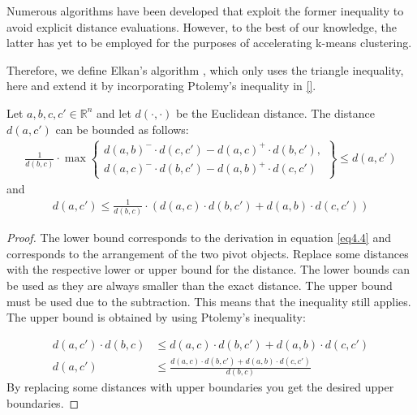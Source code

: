 Numerous algorithms have been developed that exploit the former inequality to avoid explicit distance evaluations. However, to the best of our knowledge, the latter has yet to be employed for the purposes of accelerating k-means clustering.

Therefore, we define Elkan's algorithm \cite{}, which only uses the triangle inequality, here and extend it by incorporating Ptolemy's inequality in \ref{}.



\begin{theorem}
	\label{thm4.2}
	Let \(a, b, c, c' \in \mathbb{R}^n\) and let \(d(\cdot, \cdot)\) be the Euclidean distance. The distance \(d(a, c')\) can be bounded as follows:
	\begin{gather}
		\frac{1}{d(b, c)} \cdot \max \left\{
		\begin{array}{l}
			d(a, b)^- \cdot d(c, c') - d(a, c)^+ \cdot d(b, c'), \\
			d(a, c)^- \cdot d(b, c') - d(a, b)^+ \cdot d(c, c')
		\end{array}
		\right\} \leq d(a, c')
	\end{gather}
	and
	\begin{gather}
		d(a, c') \leq \frac{1}{d(b, c)} \cdot \left( d(a, c) \cdot d(b, c') + d(a, b) \cdot d(c, c') \right)
	\end{gather}
\end{theorem}
\begin{proof}
	The lower bound corresponds to the derivation in equation \ref{eq4.4} and corresponds to the arrangement of the two pivot objects. Replace some distances with the respective lower or upper bound for the distance. The lower bounds can be used as they are always smaller than the exact distance. The upper bound must be used due to the subtraction. This means that the inequality still applies. The upper bound is obtained by using Ptolemy's inequality:

	\begin{equation*}
		\begin{aligned}
			\label{eq4.7}
			d(a,c') \cdot d(b,c) & \leq d(a, c) \cdot d(b, c') + d(a, b) \cdot d(c, c')                \\
			d(a,c')              & \leq \frac{d(a, c) \cdot d(b, c') + d(a, b) \cdot d(c, c')}{d(b,c)}
		\end{aligned}
	\end{equation*}
	By replacing some distances with upper boundaries you get the desired upper boundaries.
\end{proof}




